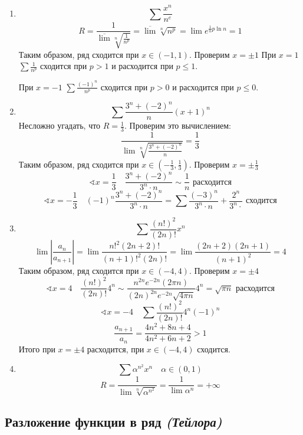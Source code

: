 \begin{exercise}[2812-\dots]\itemfix
    \begin{enumerate}
        \item \[\sum \frac{x^n}{n^e}\]
              \[R = \frac{1}{\overline \lim\sqrt[n]{\frac{1}{n^p}}} = \overline \lim\sqrt[n]{n^p} = \lim e^{\frac{1}{n} p\ln n} = 1\]
              Таким образом, ряд сходится при \(x \in ( - 1, 1)\). Проверим \(x = \pm 1\)
              При \(x = 1\) \(\sum \frac{1}{n^p}\) сходится при \(p > 1\) и расходится при \(p \leq 1\).

              При \(x = - 1\) \(\sum \frac{( - 1)^n}{n^p} \) сходится при \(p > 0\) и расходится при \(p \leq 0\).
        \item \[\sum \frac{3^n + ( - 2)^n}{n}(x + 1)^n\]
              Несложно угадать, что \(R = \frac{1}{3}\). Проверим это вычислением:
              \[\frac{1}{\lim\sqrt[n]{\frac{3^n +( - 2)^n}{n} }} = \frac{1}{3}\]
              Таким образом, ряд сходится при \(x \in ( - \frac{1}{3}, \frac{1}{3})\). Проверим \(x = \pm \frac{1}{3}\)
              \[\sphericalangle x = \frac{1}{3} \quad \frac{3^{n} + ( - 2)^n}{3^n \cdot n} \sim \frac{1}{n} \text{ расходится} \]
              \[\sphericalangle x = - \frac{1}{3} \quad ( - 1)^n\frac{3^{n} + ( - 2)^n}{3^n \cdot n} = \sum \frac{( - 3)^n}{3^n \cdot n} + \frac{2^n}{3^n \cdot} \text{ сходится}\]
        \item \[\sum \frac{(n!)^2}{(2n)!} x^n\]
              \[\lim \left|\frac{a_n}{a_{n + 1}} \right| = \lim \frac{n!^2 (2n + 2)!}{(n + 1)!^2 (2n)!} = \lim \frac{(2n + 2)(2n + 1)}{(n + 1)^2} = 4\]
              Таким образом, ряд сходится при \(x \in ( - 4, 4)\). Проверим \(x = \pm 4\)
              \[\sphericalangle x = 4 \quad \frac{(n!)^2}{(2n)!} 4^n \sim \frac{n^{2n} e^{ - 2n} (2\pi n)}{(2n)^{2n} e^{ - 2n}\sqrt{4\pi n}} 4^n = \sqrt{\pi n} \text{ расходится}\]
              \[\sphericalangle x = - 4 \quad \sum \frac{(n!)^2}{(2n)!} 4^n ( - 1)^n\]
              \[\frac{a_{n+1}}{a_n} = \frac{4n^2 + 8n + 4}{4n^2 + 6n + 2} > 1\]
              Итого при \(x = \pm 4\) расходится, при \(x\in ( - 4, 4)\) сходится.
        \item \[\sum \alpha^{n^2} x^n \quad \alpha\in(0,1)\]
              \[R = \frac{1}{\lim\sqrt[n]{\alpha^{n^2}}} = \frac{1}{\lim \alpha^{n}} = +\infty\]
    \end{enumerate}
\end{exercise}

\subsection*{Разложение функции в ряд \textit{(Тейлора)}}

